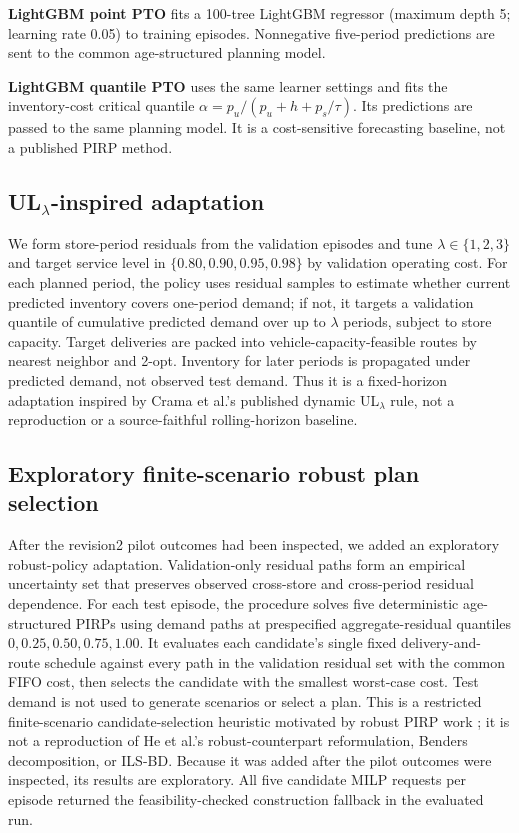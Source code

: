 \documentclass[11pt,a4paper]{article}
\begin{document}
\textbf{LightGBM point PTO} fits a 100-tree LightGBM regressor (maximum depth 5; learning rate 0.05) to training episodes. Nonnegative five-period predictions are sent to the common age-structured planning model.

\textbf{LightGBM quantile PTO} uses the same learner settings and fits the inventory-cost critical quantile $\alpha=p_u/(p_u+h+p_s/\tau)$. Its predictions are passed to the same planning model. It is a cost-sensitive forecasting baseline, not a published PIRP method.

\subsection{UL$_\lambda$-inspired adaptation}

We form store-period residuals from the validation episodes and tune $\lambda\in\{1,2,3\}$ and target service level in $\{0.80,0.90,0.95,0.98\}$ by validation operating cost. For each planned period, the policy uses residual samples to estimate whether current predicted inventory covers one-period demand; if not, it targets a validation quantile of cumulative predicted demand over up to $\lambda$ periods, subject to store capacity. Target deliveries are packed into vehicle-capacity-feasible routes by nearest neighbor and 2-opt. Inventory for later periods is propagated under predicted demand, not observed test demand. Thus it is a fixed-horizon adaptation inspired by Crama et al.'s published dynamic UL$_\lambda$ rule, not a reproduction or a source-faithful rolling-horizon baseline.

\subsection{Exploratory finite-scenario robust plan selection}

After the revision2 pilot outcomes had been inspected, we added an exploratory robust-policy adaptation. Validation-only residual paths form an empirical uncertainty set that preserves observed cross-store and cross-period residual dependence. For each test episode, the procedure solves five deterministic age-structured PIRPs using demand paths at prespecified aggregate-residual quantiles $0,0.25,0.50,0.75,1.00$. It evaluates each candidate's single fixed delivery-and-route schedule against every path in the validation residual set with the common FIFO cost, then selects the candidate with the smallest worst-case cost. Test demand is not used to generate scenarios or select a plan. This is a restricted finite-scenario candidate-selection heuristic motivated by robust PIRP work \citep{he2024robust}; it is not a reproduction of He et al.'s robust-counterpart reformulation, Benders decomposition, or ILS-BD. Because it was added after the pilot outcomes were inspected, its results are exploratory. All five candidate MILP requests per episode returned the feasibility-checked construction fallback in the evaluated run.
\end{document}
